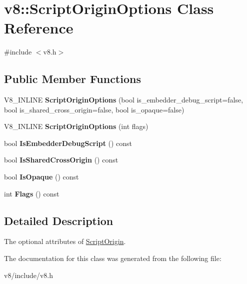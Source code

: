 \hypertarget{classv8_1_1ScriptOriginOptions}{}\section{v8\+:\+:Script\+Origin\+Options Class Reference}
\label{classv8_1_1ScriptOriginOptions}


{\ttfamily \#include $<$v8.\+h$>$}

\subsection*{Public Member Functions}
\begin{DoxyCompactItemize}
\item 
\hypertarget{classv8_1_1ScriptOriginOptions_a350ff2a0c6b3b0449adefdd920d6808e}{}V8\+\_\+\+I\+N\+L\+I\+N\+E {\bfseries Script\+Origin\+Options} (bool is\+\_\+embedder\+\_\+debug\+\_\+script=false, bool is\+\_\+shared\+\_\+cross\+\_\+origin=false, bool is\+\_\+opaque=false)\label{classv8_1_1ScriptOriginOptions_a350ff2a0c6b3b0449adefdd920d6808e}

\item 
\hypertarget{classv8_1_1ScriptOriginOptions_a5c814c5602db2c9ed5c6bc7f05b1d430}{}V8\+\_\+\+I\+N\+L\+I\+N\+E {\bfseries Script\+Origin\+Options} (int flags)\label{classv8_1_1ScriptOriginOptions_a5c814c5602db2c9ed5c6bc7f05b1d430}

\item 
\hypertarget{classv8_1_1ScriptOriginOptions_a4076a3f22dff99a2337ab86d4024ee46}{}bool {\bfseries Is\+Embedder\+Debug\+Script} () const \label{classv8_1_1ScriptOriginOptions_a4076a3f22dff99a2337ab86d4024ee46}

\item 
\hypertarget{classv8_1_1ScriptOriginOptions_a28aa1b32efc3b20b16d65c4176831b4c}{}bool {\bfseries Is\+Shared\+Cross\+Origin} () const \label{classv8_1_1ScriptOriginOptions_a28aa1b32efc3b20b16d65c4176831b4c}

\item 
\hypertarget{classv8_1_1ScriptOriginOptions_ae658f2c06876f86205af4f69804193ab}{}bool {\bfseries Is\+Opaque} () const \label{classv8_1_1ScriptOriginOptions_ae658f2c06876f86205af4f69804193ab}

\item 
\hypertarget{classv8_1_1ScriptOriginOptions_a17e20a214bc8df902419b81c32590efe}{}int {\bfseries Flags} () const \label{classv8_1_1ScriptOriginOptions_a17e20a214bc8df902419b81c32590efe}

\end{DoxyCompactItemize}


\subsection{Detailed Description}
The optional attributes of \hyperlink{classv8_1_1ScriptOrigin}{Script\+Origin}. 

The documentation for this class was generated from the following file\+:\begin{DoxyCompactItemize}
\item 
v8/include/v8.\+h\end{DoxyCompactItemize}
